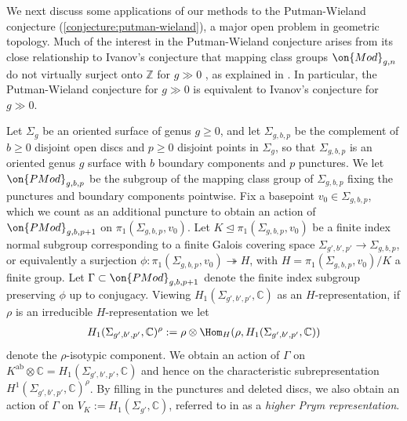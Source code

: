 We next discuss some applications of our methods to the Putman-Wieland
conjecture (\autoref{conjecture:putman-wieland}), a major open problem in geometric topology. Much of the interest in the Putman-Wieland conjecture arises from its close relationship to Ivanov's conjecture that mapping class groups $\on{Mod}_{g,n}$ do not virtually surject onto $\mathbb{Z}$ for $g\gg 0$ \cite[\S7]{Ivanov:problems}, as explained in
\cite[Theorem 1.3]{putmanW:abelian-quotients}. In particular, the Putman-Wieland conjecture for $g\gg 0$ is equivalent to Ivanov's conjecture for $g\gg 0$.
\begin{notation}
\notready
	\label{notation:prym}
Let $\Sigma_g$ be an oriented surface of genus $g \geq 0$, and let
$\Sigma_{g,b,p}$ be the complement of $b\geq 0$ disjoint open discs and $p\geq 0$ disjoint points in $\Sigma_g$, so that $\Sigma_{g,b,p}$ is an oriented genus $g$ surface with $b$ boundary components and $p$ punctures. We let $\on{PMod}_{g,b,p}$ be the subgroup of the mapping class group of $\Sigma_{g,b,p}$ fixing the punctures and boundary components pointwise.
Fix a basepoint $v_0 \in \Sigma_{g,b,p}$, which we count as an additional puncture to
obtain an action of $\on{PMod}_{g,b,p+1}$ on $\pi_1(\Sigma_{g,b,p},v_0)$.
Let $K \trianglelefteq \pi_1(\Sigma_{g,b,p}, v_0)$ be a finite index normal subgroup
corresponding to a finite Galois covering space $\Sigma_{g',b',p'} \to \Sigma_{g,b,p}$,
or equivalently a surjection
$\phi: \pi_1(\Sigma_{g,b,p}, v_0) \twoheadrightarrow H$, with $H=\pi_1(\Sigma_{g,b,p}, v_0)/K$ a finite group.
Let $\Gamma \subset \on{PMod}_{g,b,p+1}$ denote the finite index subgroup preserving
$\phi$ up to conjugacy.
Viewing
$H_1(\Sigma_{g',b',p'},\mathbb C)$ as an $H$-representation,
if $\rho$ is an irreducible $H$-representation we let
\begin{align*}
	H_1(\Sigma_{g',b',p'},\mathbb C)^\rho := \rho \otimes \Hom_H(\rho,
H_1(\Sigma_{g',b',p'},\mathbb C))
\end{align*}
denote the $\rho$-isotypic component.
We obtain an action of $\Gamma$ on $K^{\text{ab}}\otimes \mathbb{C}=H_1(\Sigma_{g',b',p'},\mathbb C)$
and hence on the characteristic subrepresentation
$H^1(\Sigma_{g',b',p'},\mathbb C)^\rho$.
By filling in the punctures and deleted discs, we also obtain
an action of $\Gamma$ on $V_K := H_1(\Sigma_{g'}, \mathbb C)$, referred to in
\cite[p. 80-81]{putmanW:abelian-quotients} as a {\em higher Prym
representation}.
\end{notation}

